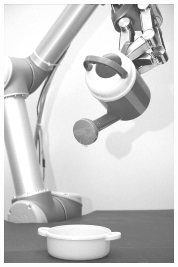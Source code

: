 \begin{figure}[H]
\begin{subfigure}[b]{0.1\textwidth}
        \includegraphics[width=\textwidth]{img3/test/contrast_5_1_1_final_img3.png}
    \end{subfigure}
        \begin{subfigure}[b]{0.1\textwidth}

\end{subfigure}
\end{figure}
